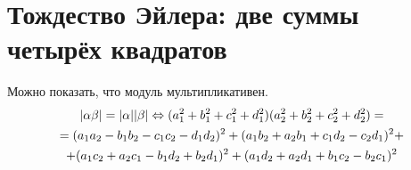 \section{Тождество Эйлера: две суммы четырёх квадратов}

Можно показать, что модуль мультипликативен.
\begin{gather*}
|\alpha \beta| = |\alpha||\beta| \Leftrightarrow (a_1^2+b_1^2+c_1^2+d_1^2)(a_2^2+b_2^2+c_2^2+d_2^2) = \\
= (a_1a_2 - b_1b_2 - c_1c_2 - d_1d_2)^2 + (a_1b_2 + a_2b_1 + c_1d_2 - c_2d_1)^2 + \\
+ (a_1c_2 + a_2c_1 - b_1d_2 + b_2d_1)^2 + (a_1d_2 + a_2d_1 + b_1c_2 - b_2c_1)^2
\end{gather*}